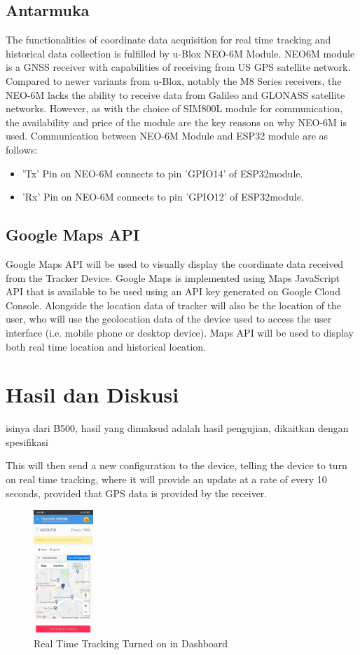 \documentclass[conference]{IEEEtran}
\begin{document}
\subsection{Antarmuka}
The functionalities of coordinate data acquisition for real time tracking and historical data collection is fulfilled by u-Blox NEO-6M Module. NEO6M module is a GNSS receiver with capabilities of receiving from US GPS satellite network. Compared to newer variants from u-Blox, notably the M8 Series receivers, the NEO-6M lacks the ability to receive data from Galileo and GLONASS satellite networks. However, as with 
the choice of SIM800L module for communication, the availability and price of the module are the key reasons on why NEO-6M is used. Communication between NEO-6M Module and ESP32 module are as follows:
\begin{itemize}
\item 'Tx' Pin on NEO-6M connects to pin 'GPIO14' of ESP32module.
\item 'Rx' Pin on NEO-6M connects to pin 'GPIO12' of ESP32module.
\end{itemize}

\subsection{Google Maps API}
Google Maps API will be used to visually display the coordinate data received from the Tracker Device. Google Maps is implemented using Maps JavaScript API that is available to be used using an API key generated on Google Cloud Console. Alongside the location data of tracker will also be the location of the user, who will use the geolocation data of the device used to access the user interface (i.e. mobile phone or desktop device). Maps API will be used to display both real time location and historical location.

\section{Hasil dan Diskusi}

isinya dari B500, hasil yang dimaksud adalah hasil pengujian, dikaitkan dengan spesifikasi

This will then send a new configuration to the device, telling the device to turn on real time tracking, where it will provide an update at a rate of every 10 seconds, provided that GPS data is provided by the receiver.

\begin{figure}[h]
    \centering
    \includegraphics[width=0.2\textwidth]{realtimeon}
    \caption{Real Time Tracking Turned on in Dashboard}
    \label{fig6}
\end{figure}
\end{document}
